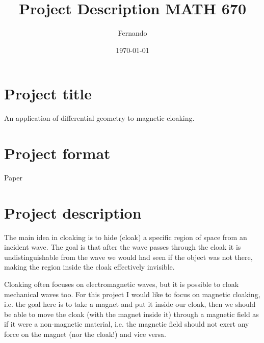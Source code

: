 \documentclass{article}
\begin{document}
\newcommand{\R}{\mathbb{R}}

\title{Project Description MATH 670}
\author{Fernando}
\date{\today}
\maketitle

\section*{Project title}

An application of differential geometry to magnetic cloaking.

\section*{Project format}
Paper

\section*{Project description}

The main idea in cloaking is to hide (cloak) a
specific region of space from an incident wave. The goal is that after the wave
passes through the cloak it is undistinguishable from the wave we would had
seen if the object was not there, making the region inside the cloak
effectively invisible.

Cloaking often focuses on electromagnetic waves, but it is possible to cloak
mechanical waves too. For this project I would like to focus on magnetic
cloaking, i.e. the goal here is to take a magnet and put it inside our cloak,
then we should be able to move the cloak (with the magnet inside it) through a
magnetic field as if it were a non-magnetic material, i.e. the magnetic field
should not exert any force on the magnet (nor the cloak!) and vice versa.
\end{document}
